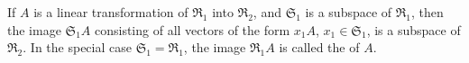 If $A$ is a linear transformation of $\mathfrak{R}_1$ into $\mathfrak{R}_2$, and $\mathfrak{S}_1$ is a subspace of $\mathfrak{R}_1$, then the image $\mathfrak{S}_1 A$ consisting of all vectors of the form $x_1 A$, $x_1 \in \mathfrak{S}_1$, is a subspace of $\mathfrak{R}_2$. In the special case $\mathfrak{S}_1 = \mathfrak{R}_1$, the image $\mathfrak{R}_1 A$ is called the  of $A$.
